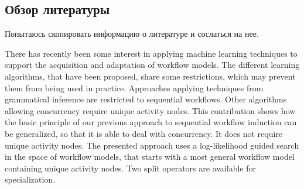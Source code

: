 \subsection{Обзор литературы} \label{sect1_2_1}
Попытаюсь скопировать информацию о литературе и сослаться на нее. 

There has recently been some interest in applying machine learning techniques to support the acquisition and adaptation of workflow models. The different learning algorithms, that have been proposed, share some restrictions, which may prevent them from being used in practice. Approaches applying techniques from grammatical inference are restricted to sequential workflows. Other algorithms allowing concurrency require unique activity nodes. This contribution shows how the basic principle of our previous approach to sequential workflow induction can be generalized, so that it is able to deal with concurrency. It does not require unique activity nodes. The presented approach uses a log-likelihood guided search in the space of workflow models, that starts with a most general workflow model containing unique activity nodes. Two split operators are available for specialization. \cite{Herbst2000}






